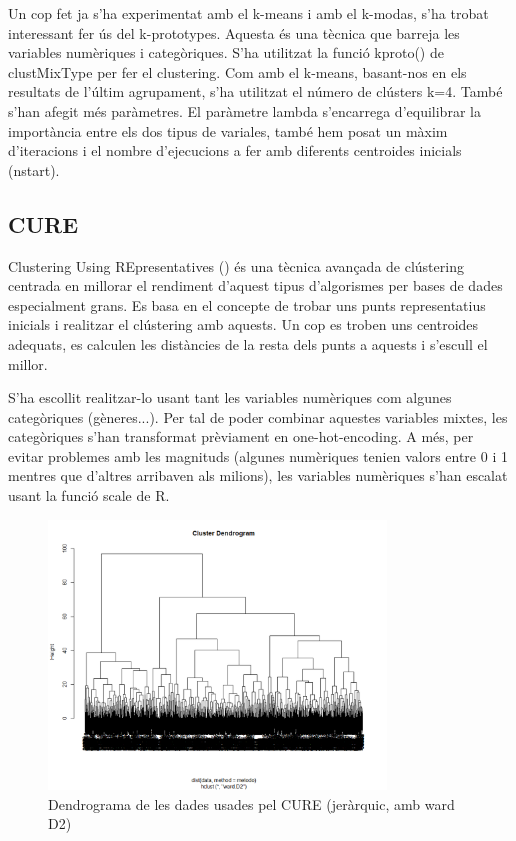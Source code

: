 Un cop fet ja s'ha experimentat amb el k-means i amb el k-modas, s'ha trobat interessant  fer ús del k-prototypes. Aquesta és una tècnica que barreja les variables numèriques i categòriques. S'ha utilitzat la funció kproto() de clustMixType per fer el clustering. Com amb el k-means, basant-nos en els resultats de l'últim agrupament, s'ha utilitzat el número de clústers k=4. També s'han afegit més paràmetres. El paràmetre lambda s'encarrega d'equilibrar la importància entre els dos tipus de variales, també hem posat un màxim d'iteracions i el nombre d'ejecucions a fer amb diferents centroides inicials (nstart). 

\subsection{CURE}
Clustering Using REpresentatives (\cite{guha_1998_cure}) és una tècnica avançada de clústering centrada en millorar el rendiment d’aquest tipus d’algorismes per bases de dades especialment grans. Es basa en el concepte de trobar uns punts representatius inicials i realitzar el clústering amb aquests. Un cop es troben uns centroides adequats, es calculen les distàncies de la resta dels punts a aquests i s’escull el millor.

S’ha escollit realitzar-lo usant tant les variables numèriques com algunes categòriques (gèneres...). Per tal de poder combinar aquestes variables mixtes, les categòriques s’han transformat prèviament en one-hot-encoding. A més, per evitar problemes amb les magnituds (algunes numèriques tenien valors entre 0 i 1 mentres que d’altres arribaven als milions), les variables numèriques s’han escalat usant la funció scale de R.

\begin{figure}[H]
    \centering
    \includegraphics[width=0.8\textwidth]{Images/4_clustering/CURE/curedendrogram.png}
    \caption{Dendrograma de les dades usades pel CURE (jeràrquic, amb ward D2)}
    \label{fig:CURE_dend}
\end{figure}

